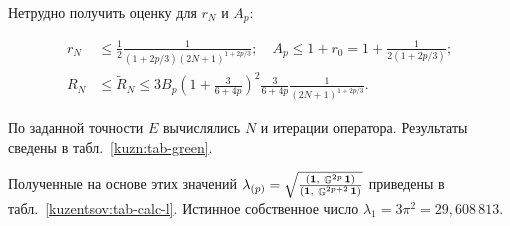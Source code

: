    Нетрудно получить оценку для $r_N$ и $A_p$:

    \begin{align*}

        r_N&\leqslant\frac{1}{2}\frac{1}{(1+2p/3)(2N+1)^{1+2p/3}};\quad

        A_p\leqslant1+r_0=1+\frac{1}{2(1+2p/3)};\\

        R_N&\leqslant\tilde R_N\leqslant3B_p\left(1+\frac{3}{6+4p}\right)^2\frac{3}{6+4p}\frac{1}{(2N+1)^{1+2p/3}}.

    \end{align*}



По заданной точности $E$ вычислялись $N$ и итерации оператора. Результаты сведены в табл.~\ref{kuzn:tab-green}.





    Полученные на основе этих значений $\lambda_{(p)}=\sqrt{\frac{\left({\mathbf{1}},\ {\mathop{\mathbb{G}}\nolimits^{2p}\mathbf{1}}\right)}{\left({\mathbf{1}},\ {\mathop{\mathbb{G}}\nolimits^{2p+2}\mathbf{1}}\right)}}$ приведены в табл.~\ref{kuzentsov:tab-calc-l}. Истинное собственное число $\lambda_1=3\pi^2=29,608\,813$.





